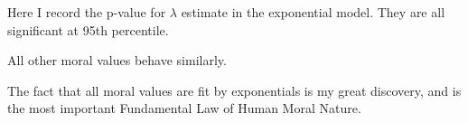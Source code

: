 \documentclass{amsart}
\begin{document}
Here I record the p-value for $\lambda$ estimate in the exponential model.  They are all significant at 95th percentile.

All other moral values behave similarly.

The fact that all moral values are fit by exponentials is my great discovery, and is the most important Fundamental Law of Human Moral Nature.  
\end{document}

